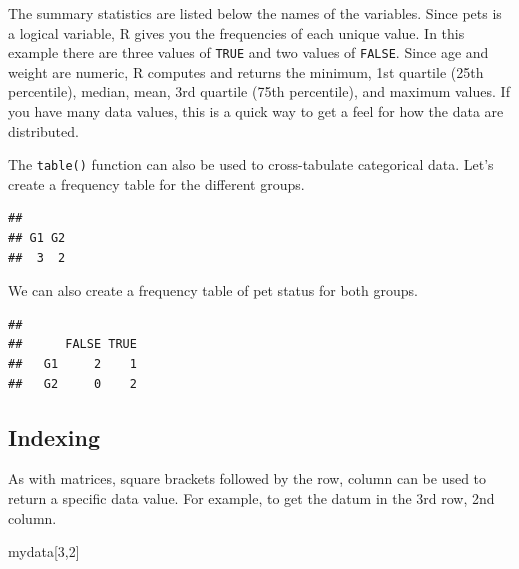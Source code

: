 \documentclass[
]{book}
\newenvironment{Shaded}{\begin{snugshade}}{\end{snugshade}}
\newcommand{\DecValTok}[1]{\textcolor[rgb]{0.00,0.00,0.81}{#1}}
\newcommand{\KeywordTok}[1]{\textcolor[rgb]{0.13,0.29,0.53}{\textbf{#1}}}
\newcommand{\NormalTok}[1]{#1}
\newcommand{\OperatorTok}[1]{\textcolor[rgb]{0.81,0.36,0.00}{\textbf{#1}}}
\begin{document}
The summary statistics are listed below the names of the variables. Since pets is a logical variable, R gives you the frequencies of each unique value. In this example there are three values of \texttt{TRUE} and two values of \texttt{FALSE}. Since age and weight are numeric, R computes and returns the minimum, 1st quartile (25th percentile), median, mean, 3rd quartile (75th percentile), and maximum values. If you have many data values, this is a quick way to get a feel for how the data are distributed.

The \texttt{table()} function can also be used to cross-tabulate categorical data. Let's create a frequency table for the different groups.

\begin{Shaded}
\end{Shaded}

\begin{verbatim}
## 
## G1 G2 
##  3  2
\end{verbatim}

We can also create a frequency table of pet status for both groups.

\begin{Shaded}
\end{Shaded}

\begin{verbatim}
##     
##      FALSE TRUE
##   G1     2    1
##   G2     0    2
\end{verbatim}

\hypertarget{indexing}{%
\subsection*{Indexing}\label{indexing}}

As with matrices, square brackets followed by the row, column can be used to return a specific data value. For example, to get the datum in the 3rd row, 2nd column.

\begin{Shaded}
\begin{Highlighting}[]
\NormalTok{mydata[}\DecValTok{3}\NormalTok{,}\DecValTok{2}\NormalTok{]}
\end{Highlighting}
\end{Shaded}
\end{document}
